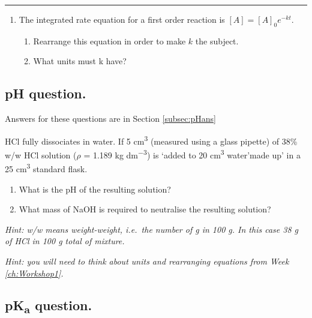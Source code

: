 \documentclass[
]{book}
\providecommand{\tightlist}{%
  \setlength{\itemsep}{0pt}\setlength{\parskip}{0pt}}
\begin{document}
\begin{center}\rule{0.5\linewidth}{0.5pt}\end{center}

\begin{enumerate}
\def\labelenumi{\arabic{enumi}.}
\setcounter{enumi}{1}
\tightlist
\item
  The integrated rate equation for a first order reaction is \([A]=[A]_0 e^{-kt}\).

  \begin{enumerate}
  \def\labelenumii{\alph{enumii}.}
  \tightlist
  \item
    Rearrange this equation in order to make \(k\) the subject.
  \item
    What units must k have?
  \end{enumerate}
\end{enumerate}

\hypertarget{sec:pH}{%
\subsection{pH question.}\label{sec:pH}}

Answers for these questions are in Section \ref{subsec:pHans}

HCl fully dissociates in water. If 5 cm\textsuperscript{3} (measured using a glass pipette) of 38\% w/w HCl solution (\(\rho\) = 1.189 kg dm\textsuperscript{−3}) is `added to 20 cm\textsuperscript{3} water'made up' in a 25 cm\textsuperscript{3} standard flask.

\begin{enumerate}
\def\labelenumi{\alph{enumi}.}
\tightlist
\item
  What is the pH of the resulting solution?
\item
  What mass of NaOH is required to neutralise the resulting solution?
\end{enumerate}

\emph{Hint: w/w means weight-weight, i.e.~the number of g in 100 g. In this case 38 g of HCl in 100 g total of mixture.}

\emph{Hint: you will need to think about units and rearranging equations from Week \ref{ch:Workshop1}.}

\hypertarget{sec:pKa}{%
\subsection{\texorpdfstring{pK\textsubscript{a} question.}{pKa question.}}\label{sec:pKa}}
\end{document}
